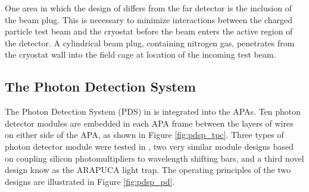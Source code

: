 One area in which the design of \protodune{} differs from the far detector is
the inclusion of the beam plug. This is necessary to minimize interactions
between the charged particle test beam and the cryostat before the beam enters 
the active region of the detector. A cylindrical beam plug, containing 
nitrogen gas, penetrates from the cryostat wall into the field cage at 
location of the incoming test beam. 

\subsection{The Photon Detection System}

The Photon Detection System (PDS) in \protodune{} is integrated into the APAs. 
Ten photon detector modules are embedded in each APA frame between the layers 
of wires on either side of the APA, as shown in Figure \ref{fig:pdsp_tpc}. 
Three types of photon detector module were tested in \protodune{}, two very 
similar module designs based on coupling silicon photomultipliers to 
wavelength shifting bars, and a third novel design know as the ARAPUCA light 
trap. The operating principles of the two designs are illustrated in Figure 
\ref{fig:pdsp_pd}.

